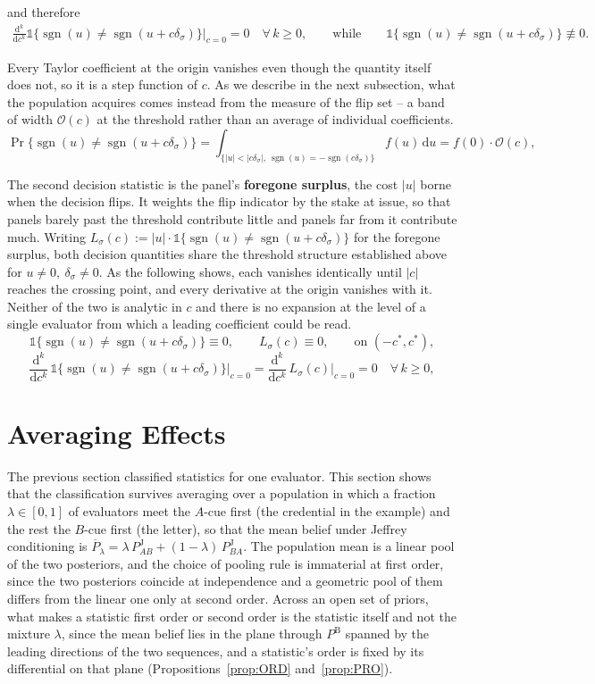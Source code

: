 \documentclass[a4paper,fleqn]{cas-sc}
\theoremstyle{remark}
\theoremstyle{definition}
\newcommand{\PB}{P^{\mathrm{B}}}
\newcommand{\PJ}{P^{\mathrm{J}}}
\newcommand{\Pbar}{\overline{P}}
\newcommand{\sgn}{\operatorname{sgn}}
\newcommand{\bigO}{\mathcal{O}}
\begin{document}
and therefore
\begin{align*}
  \frac{\mathrm{d}^{k}}{\mathrm{d}c^{k}}
  \mathds{1}\{\sgn(u)\neq\sgn(u+c\delta_\sigma)\}\bigg|_{c=0}=0
  \quad \forall\, k\ge 0,
  \qquad\text{while}\qquad
  \mathds{1}\{\sgn(u)\neq\sgn(u+c\delta_\sigma)\}\not\equiv 0.
\end{align*}

Every Taylor coefficient at the origin vanishes even though the quantity itself does not, so it is a step function of $c$. As we describe in the next subsection, what the
population acquires comes instead from the measure of the flip set -- a band of width $\bigO(c)$ at the threshold rather than an average of individual coefficients.
\[
  \Pr\{\sgn(u)\neq\sgn(u+c\delta_\sigma)\}
   =\int_{\{|u|<|c\delta_\sigma|,\ \sgn(u)=-\sgn(c\delta_\sigma)\}} f(u)\,\mathrm{d}u
   =f(0)\cdot\bigO(c),
\]

The second decision statistic is the panel's \textbf{foregone surplus}, the cost $|u|$ borne when the decision flips. It weights the flip indicator by the stake at issue, so that panels barely past the threshold contribute little and panels far from it contribute much. Writing $L_\sigma(c):=|u|\cdot\mathds{1}\{\sgn(u)\neq\sgn(u+c\delta_\sigma)\}$ for the foregone surplus, both decision quantities share the threshold structure established above for $u\neq0,\ \delta_\sigma\neq0$. As the following shows, each vanishes identically until $|c|$ reaches the crossing point, and every derivative at the origin vanishes with it. Neither of the two is analytic in $c$ and there is no expansion at the level of a single evaluator from which a leading coefficient could be read.
\[
  \mathds{1}\{\sgn(u)\neq\sgn(u+c\delta_\sigma)\}\equiv 0,
  \qquad
  L_\sigma(c)\equiv 0,
  \qquad\text{on } (-c^{*},c^{*}),
\]
\[
  \frac{\mathrm{d}^{k}}{\mathrm{d}c^{k}}\,\mathds{1}\{\sgn(u)\neq\sgn(u+c\delta_\sigma)\}
  \bigg|_{c=0}
  =
  \frac{\mathrm{d}^{k}}{\mathrm{d}c^{k}}\,L_\sigma(c)\bigg|_{c=0}
  =0
  \quad \forall\, k\ge 0,
\]

\section{Averaging Effects}
\label{sec:aggregation}

The previous section classified statistics for one evaluator. This section shows
that the classification survives averaging over a population in which a fraction
$\lambda\in[0,1]$ of evaluators meet the $A$-cue first (the credential in the
example) and the rest the $B$-cue first (the letter), so that the mean belief under
Jeffrey conditioning is $\Pbar_\lambda=\lambda\,\PJ_{AB}+(1-\lambda)\,\PJ_{BA}$. The population mean is a linear pool of the two posteriors, and the choice of
pooling rule is immaterial at first order, since the two posteriors coincide at
independence and a geometric pool of them differs from the linear one only at
second order.
Across an open set of priors, what makes a statistic first order or second order is
the statistic itself and not the mixture $\lambda$, since the mean belief lies in
the plane through $\PB$ spanned by the leading directions of the two sequences,
and a statistic's order is fixed by its differential on that plane
(Propositions~\ref{prop:ORD} and~\ref{prop:PRO}).
\end{document}
